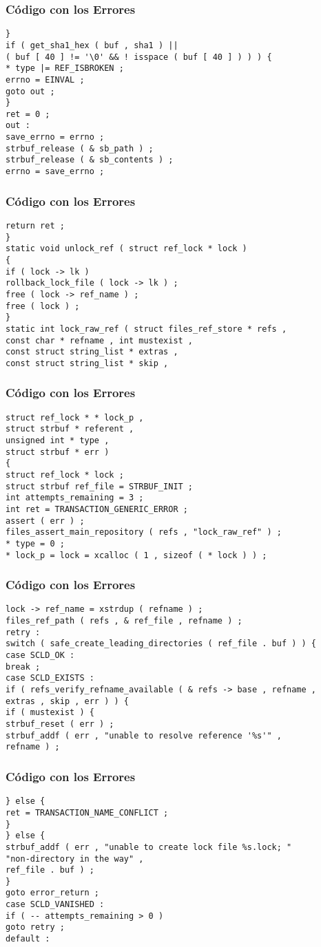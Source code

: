 \documentclass{beamer}
\begin{document}
\begin{frame}[fragile]
\frametitle{C\'odigo con los Errores}
\begin{verbatim}
} 
if ( get_sha1_hex ( buf , sha1 ) || 
( buf [ 40 ] != '\0' && ! isspace ( buf [ 40 ] ) ) ) { 
* type |= REF_ISBROKEN ; 
errno = EINVAL ; 
goto out ; 
} 
ret = 0 ; 
out : 
save_errno = errno ; 
strbuf_release ( & sb_path ) ; 
strbuf_release ( & sb_contents ) ; 
errno = save_errno ; 
\end{verbatim}
\end{frame}
\begin{frame}[fragile]
\frametitle{C\'odigo con los Errores}
\begin{verbatim}
return ret ; 
} 
static void unlock_ref ( struct ref_lock * lock ) 
{ 
if ( lock -> lk ) 
rollback_lock_file ( lock -> lk ) ; 
free ( lock -> ref_name ) ; 
free ( lock ) ; 
} 
static int lock_raw_ref ( struct files_ref_store * refs , 
const char * refname , int mustexist , 
const struct string_list * extras , 
const struct string_list * skip , 
\end{verbatim}
\end{frame}
\begin{frame}[fragile]
\frametitle{C\'odigo con los Errores}
\begin{verbatim}
struct ref_lock * * lock_p , 
struct strbuf * referent , 
unsigned int * type , 
struct strbuf * err ) 
{ 
struct ref_lock * lock ; 
struct strbuf ref_file = STRBUF_INIT ; 
int attempts_remaining = 3 ; 
int ret = TRANSACTION_GENERIC_ERROR ; 
assert ( err ) ; 
files_assert_main_repository ( refs , "lock_raw_ref" ) ; 
* type = 0 ; 
* lock_p = lock = xcalloc ( 1 , sizeof ( * lock ) ) ; 
\end{verbatim}
\end{frame}
\begin{frame}[fragile]
\frametitle{C\'odigo con los Errores}
\begin{verbatim}
lock -> ref_name = xstrdup ( refname ) ; 
files_ref_path ( refs , & ref_file , refname ) ; 
retry : 
switch ( safe_create_leading_directories ( ref_file . buf ) ) { 
case SCLD_OK : 
break ; 
case SCLD_EXISTS : 
if ( refs_verify_refname_available ( & refs -> base , refname , 
extras , skip , err ) ) { 
if ( mustexist ) { 
strbuf_reset ( err ) ; 
strbuf_addf ( err , "unable to resolve reference '%s'" , 
refname ) ; 
\end{verbatim}
\end{frame}
\begin{frame}[fragile]
\frametitle{C\'odigo con los Errores}
\begin{verbatim}
} else { 
ret = TRANSACTION_NAME_CONFLICT ; 
} 
} else { 
strbuf_addf ( err , "unable to create lock file %s.lock; " 
"non-directory in the way" , 
ref_file . buf ) ; 
} 
goto error_return ; 
case SCLD_VANISHED : 
if ( -- attempts_remaining > 0 ) 
goto retry ; 
default : 
\end{verbatim}
\end{frame}
\end{document}

